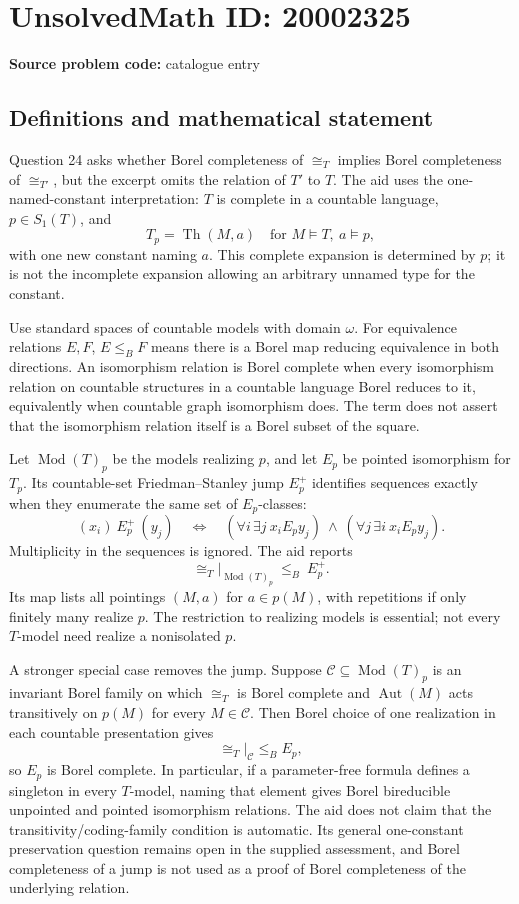 \documentclass[11pt]{article}
\begin{document}
\section*{UnsolvedMath ID: 20002325}
\textbf{Source problem code:} catalogue entry
\subsection{Definitions and mathematical statement}
Question 24 asks whether Borel completeness of \(\cong_T\) implies Borel completeness of \(\cong_{T'}\), but the excerpt omits the relation of \(T'\) to \(T\). The aid uses the one-named-constant interpretation: \(T\) is complete in a countable language, \(p\in S_1(T)\), and
\[
 T_p=\operatorname{Th}(M,a)\quad\text{for }M\models T,\ a\models p,
\]
with one new constant naming \(a\). This complete expansion is determined by \(p\); it is not the incomplete expansion allowing an arbitrary unnamed type for the constant.

Use standard spaces of countable models with domain \(\omega\). For equivalence relations \(E,F\), \(E\le_B F\) means there is a Borel map reducing equivalence in both directions. An isomorphism relation is Borel complete when every isomorphism relation on countable structures in a countable language Borel reduces to it, equivalently when countable graph isomorphism does. The term does not assert that the isomorphism relation itself is a Borel subset of the square.

Let \(\operatorname{Mod}(T)_p\) be the models realizing \(p\), and let \(E_p\) be pointed isomorphism for \(T_p\). Its countable-set Friedman--Stanley jump \(E_p^+\) identifies sequences exactly when they enumerate the same set of \(E_p\)-classes:
\[
 (x_i)\ E_p^+\ (y_j)
 \quad\Longleftrightarrow\quad
 (\forall i\,\exists j\ x_iE_py_j)\ \wedge\
 (\forall j\,\exists i\ x_iE_py_j).
\]
Multiplicity in the sequences is ignored. The aid reports
\[
 \cong_T|_{\operatorname{Mod}(T)_p}\ \le_B\ E_p^+.
\]
Its map lists all pointings \((M,a)\) for \(a\in p(M)\), with repetitions if only finitely many realize \(p\). The restriction to realizing models is essential; not every \(T\)-model need realize a nonisolated \(p\).

A stronger special case removes the jump. Suppose \(\mathcal C\subseteq\operatorname{Mod}(T)_p\) is an invariant Borel family on which \(\cong_T\) is Borel complete and \(\operatorname{Aut}(M)\) acts transitively on \(p(M)\) for every \(M\in\mathcal C\). Then Borel choice of one realization in each countable presentation gives
\[
 \cong_T|_{\mathcal C}\le_B E_p,
\]
so \(E_p\) is Borel complete. In particular, if a parameter-free formula defines a singleton in every \(T\)-model, naming that element gives Borel bireducible unpointed and pointed isomorphism relations. The aid does not claim that the transitivity/coding-family condition is automatic. Its general one-constant preservation question remains open in the supplied assessment, and Borel completeness of a jump is not used as a proof of Borel completeness of the underlying relation.
\end{document}
